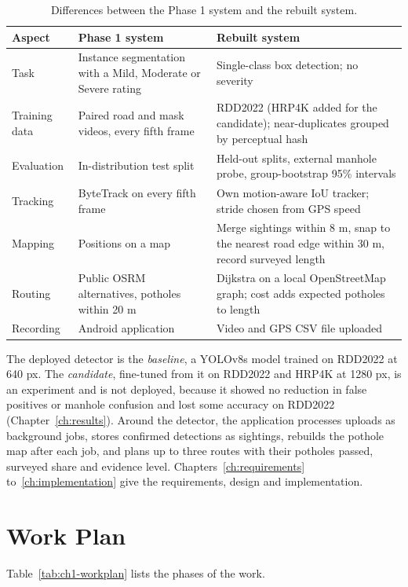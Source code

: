 \begin{table}[!htbp]
\centering
\small
\renewcommand{\arraystretch}{1.2}
\begin{tabular}{|L{2.4cm}|L{5.0cm}|L{5.6cm}|}
\hline
\textbf{Aspect} & \textbf{Phase 1 system} & \textbf{Rebuilt system} \\
\hline
Task & Instance segmentation with a Mild, Moderate or Severe rating & Single-class box detection; no severity \\
\hline
Training data & Paired road and mask videos, every fifth frame & RDD2022 (HRP4K added for the candidate); near-duplicates grouped by perceptual hash \\
\hline
Evaluation & In-distribution test split & Held-out splits, external manhole probe, group-bootstrap 95\% intervals \\
\hline
Tracking & ByteTrack on every fifth frame & Own motion-aware IoU tracker; stride chosen from GPS speed \\
\hline
Mapping & Positions on a map & Merge sightings within 8 m, snap to the nearest road edge within 30 m, record surveyed length \\
\hline
Routing & Public OSRM alternatives, potholes within 20 m & Dijkstra on a local OpenStreetMap graph; cost adds expected potholes to length \\
\hline
Recording & Android application & Video and GPS CSV file uploaded \\
\hline
\end{tabular}
\caption{Differences between the Phase 1 system and the rebuilt system.}
\label{tab:ch1-comparison}
\end{table}

The deployed detector is the \emph{baseline}, a YOLOv8s model trained on RDD2022 at 640 px. The \emph{candidate}, fine-tuned from it on RDD2022 and HRP4K \cite{chen2026hrp4k} at 1280 px, is an experiment and is not deployed, because it showed no reduction in false positives or manhole confusion and lost some accuracy on RDD2022 (Chapter~\ref{ch:results}). Around the detector, the application processes uploads as background jobs, stores confirmed detections as sightings, rebuilds the pothole map after each job, and plans up to three routes with their potholes passed, surveyed share and evidence level. Chapters~\ref{ch:requirements} to~\ref{ch:implementation} give the requirements, design and implementation.

\section{Work Plan}
Table~\ref{tab:ch1-workplan} lists the phases of the work.

